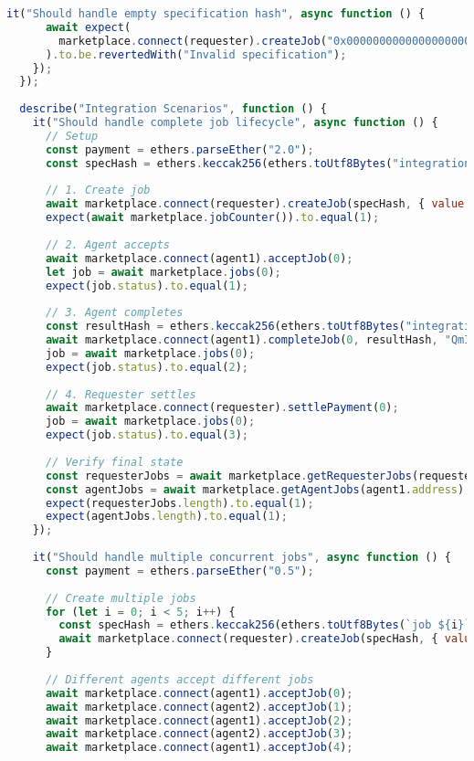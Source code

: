 \begin{lstlisting}[language=JavaScript,caption={Complete test suite for smart contracts}]
    it("Should handle empty specification hash", async function () {
      await expect(
        marketplace.connect(requester).createJob("0x0000000000000000000000000000000000000000000000000000000000000000", { value: ethers.parseEther("1") })
      ).to.be.revertedWith("Invalid specification");
    });
  });
  
  describe("Integration Scenarios", function () {
    it("Should handle complete job lifecycle", async function () {
      // Setup
      const payment = ethers.parseEther("2.0");
      const specHash = ethers.keccak256(ethers.toUtf8Bytes("integration test"));
      
      // 1. Create job
      await marketplace.connect(requester).createJob(specHash, { value: payment });
      expect(await marketplace.jobCounter()).to.equal(1);
      
      // 2. Agent accepts
      await marketplace.connect(agent1).acceptJob(0);
      let job = await marketplace.jobs(0);
      expect(job.status).to.equal(1);
      
      // 3. Agent completes
      const resultHash = ethers.keccak256(ethers.toUtf8Bytes("integration result"));
      await marketplace.connect(agent1).completeJob(0, resultHash, "QmIntegration");
      job = await marketplace.jobs(0);
      expect(job.status).to.equal(2);
      
      // 4. Requester settles
      await marketplace.connect(requester).settlePayment(0);
      job = await marketplace.jobs(0);
      expect(job.status).to.equal(3);
      
      // Verify final state
      const requesterJobs = await marketplace.getRequesterJobs(requester.address);
      const agentJobs = await marketplace.getAgentJobs(agent1.address);
      expect(requesterJobs.length).to.equal(1);
      expect(agentJobs.length).to.equal(1);
    });
    
    it("Should handle multiple concurrent jobs", async function () {
      const payment = ethers.parseEther("0.5");
      
      // Create multiple jobs
      for (let i = 0; i < 5; i++) {
        const specHash = ethers.keccak256(ethers.toUtf8Bytes(`job ${i}`));
        await marketplace.connect(requester).createJob(specHash, { value: payment });
      }
      
      // Different agents accept different jobs
      await marketplace.connect(agent1).acceptJob(0);
      await marketplace.connect(agent2).acceptJob(1);
      await marketplace.connect(agent1).acceptJob(2);
      await marketplace.connect(agent2).acceptJob(3);
      await marketplace.connect(agent1).acceptJob(4);
      

\end{lstlisting}
